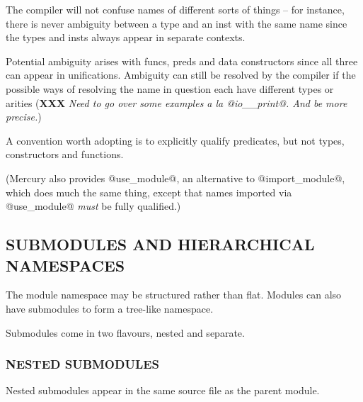 \documentclass[a4paper,11pt,notitlepage,onecolumn]{article}
\newcommand{\XXX}[1]%
{{\small\textbf{XXX} \emph{#1}}}
\begin{document}
The compiler will not confuse names of different sorts of
things -- for instance, there is never ambiguity between a type
and an inst with the same name since the types and insts
always appear in separate contexts.

Potential ambiguity arises with funcs, preds and data
constructors since all three can appear in unifications.
Ambiguity can still be resolved by the compiler if the
possible ways of resolving the name in question each have
different types or arities (\XXX{Need to go over some examples
a la @io\_\_print@.  And be more precise.})

A convention worth adopting is to explicitly qualify
predicates, but not types, constructors and functions.

(Mercury also provides @use_module@, an alternative to @import_module@,
which does much the same thing, except that names imported via
@use_module@ \emph{must} be fully qualified.)

\subsection{SUBMODULES AND HIERARCHICAL NAMESPACES}

The module namespace may be structured rather than flat.  Modules can
also have submodules to form a tree-like namespace.

Submodules come in two flavours, nested and separate.

\subsubsection{NESTED SUBMODULES}

Nested submodules appear in the same source file as the parent module.
\end{document}
